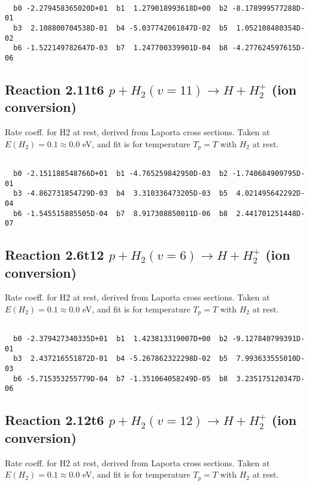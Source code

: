 \begin{small}\begin{verbatim}

  b0 -2.279458365020D+01  b1  1.279018993618D+00  b2 -8.178999577288D-01
  b3  2.108800704538D-01  b4 -5.037742061847D-02  b5  1.052108480354D-02
  b6 -1.522149782647D-03  b7  1.247700339901D-04  b8 -4.277624597615D-06

\end{verbatim}\end{small}

\newpage
\subsection{
Reaction 2.11t6
$ p + H_2(v=11) \rightarrow H + H_2^+$ (ion conversion)
}
Rate coeff. for H2 at rest, derived from Laporta cross sections.
Taken at $E(H_2) = 0.1 \approx 0.0$ eV,  and fit is for temperature $T_p=T$ with $H_2$ at rest.

\begin{small}\begin{verbatim}

  b0 -2.151188548766D+01  b1 -4.765259842950D-03  b2 -1.740684909795D-01
  b3 -4.862731854729D-03  b4  3.310336473205D-03  b5  4.021495642292D-04
  b6 -1.545515885505D-04  b7  8.917308850011D-06  b8  2.441701251448D-07

\end{verbatim}\end{small}

\newpage
\subsection{
Reaction 2.6t12
$ p + H_2(v=6) \rightarrow H + H_2^+$ (ion conversion)
}
Rate coeff. for H2 at rest, derived from Laporta cross sections.
Taken at $E(H_2) = 0.1 \approx 0.0$ eV,  and fit is for temperature $T_p=T$ with $H_2$ at rest.

\begin{small}\begin{verbatim}

  b0 -2.379427340335D+01  b1  1.423813319007D+00  b2 -9.127840799391D-01
  b3  2.437216551872D-01  b4 -5.267862322298D-02  b5  7.993633555010D-03
  b6 -5.715353255779D-04  b7 -1.351064058249D-05  b8  3.235175120347D-06

\end{verbatim}\end{small}

\newpage
\subsection{
Reaction 2.12t6
$ p + H_2(v=12) \rightarrow H + H_2^+$ (ion conversion)
}
Rate coeff. for H2 at rest, derived from Laporta cross sections.
Taken at $E(H_2) = 0.1 \approx 0.0$ eV,  and fit is for temperature $T_p=T$ with $H_2$ at rest.

